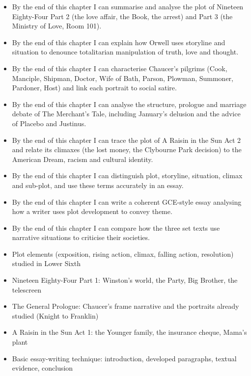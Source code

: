 \documentclass[11pt]{article}
\begin{document}
\begin{objectifs}
\begin{itemize}
\item By the end of this chapter I can summarise and analyse the plot of Nineteen Eighty-Four Part 2 (the love affair, the Book, the arrest) and Part 3 (the Ministry of Love, Room 101).
\item By the end of this chapter I can explain how Orwell uses storyline and situation to denounce totalitarian manipulation of truth, love and thought.
\item By the end of this chapter I can characterise Chaucer's pilgrims (Cook, Manciple, Shipman, Doctor, Wife of Bath, Parson, Plowman, Summoner, Pardoner, Host) and link each portrait to social satire.
\item By the end of this chapter I can analyse the structure, prologue and marriage debate of The Merchant's Tale, including January's delusion and the advice of Placebo and Justinus.
\item By the end of this chapter I can trace the plot of A Raisin in the Sun Act 2 and relate its climaxes (the lost money, the Clybourne Park decision) to the American Dream, racism and cultural identity.
\item By the end of this chapter I can distinguish plot, storyline, situation, climax and sub-plot, and use these terms accurately in an essay.
\item By the end of this chapter I can write a coherent GCE-style essay analysing how a writer uses plot development to convey theme.
\item By the end of this chapter I can compare how the three set texts use narrative situations to criticise their societies.
\end{itemize}
\end{objectifs}

\begin{prerequis}
\begin{itemize}
\item Plot elements (exposition, rising action, climax, falling action, resolution) studied in Lower Sixth
\item Nineteen Eighty-Four Part 1: Winston's world, the Party, Big Brother, the telescreen
\item The General Prologue: Chaucer's frame narrative and the portraits already studied (Knight to Franklin)
\item A Raisin in the Sun Act 1: the Younger family, the insurance cheque, Mama's plant
\item Basic essay-writing technique: introduction, developed paragraphs, textual evidence, conclusion
\end{itemize}
\end{prerequis}
\end{document}
